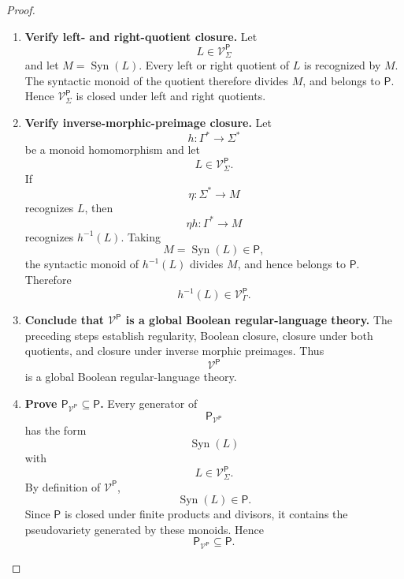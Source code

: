 \begin{proof}
\begin{enumerate}
        \item \textbf{Verify left- and right-quotient closure.}
        Let
        \[
            L\in\mathcal V^{\mathsf P}_\Sigma
        \]
        and let \(M=\operatorname{Syn}(L)\). Every left or right quotient of
        \(L\) is recognized by \(M\). The syntactic monoid of the quotient
        therefore divides \(M\), and belongs to \(\mathsf P\). Hence
        \(\mathcal V^{\mathsf P}_\Sigma\) is closed under left and right
        quotients.

        \item \textbf{Verify inverse-morphic-preimage closure.}
        Let
        \[
            h:\Gamma^*\to\Sigma^*
        \]
        be a monoid homomorphism and let
        \[
            L\in\mathcal V^{\mathsf P}_\Sigma.
        \]
        If
        \[
            \eta:\Sigma^*\to M
        \]
        recognizes \(L\), then
        \[
            \eta h:\Gamma^*\to M
        \]
        recognizes \(h^{-1}(L)\). Taking
        \[
            M=\operatorname{Syn}(L)\in\mathsf P,
        \]
        the syntactic monoid of \(h^{-1}(L)\) divides \(M\), and hence belongs
        to \(\mathsf P\). Therefore
        \[
            h^{-1}(L)
            \in
            \mathcal V^{\mathsf P}_\Gamma.
        \]

        \item \textbf{Conclude that
        \(\mathcal V^{\mathsf P}\) is a global Boolean regular-language
        theory.}
        The preceding steps establish regularity, Boolean closure, closure
        under both quotients, and closure under inverse morphic preimages.
        Thus
        \[
            \mathcal V^{\mathsf P}
        \]
        is a global Boolean regular-language theory.

        \item \textbf{Prove
        \(\mathsf P_{\mathcal V^{\mathsf P}}\subseteq\mathsf P\).}
        Every generator of
        \[
            \mathsf P_{\mathcal V^{\mathsf P}}
        \]
        has the form
        \[
            \operatorname{Syn}(L)
        \]
        with
        \[
            L\in\mathcal V^{\mathsf P}_\Sigma.
        \]
        By definition of \(\mathcal V^{\mathsf P}\),
        \[
            \operatorname{Syn}(L)\in\mathsf P.
        \]
        Since \(\mathsf P\) is closed under finite products and divisors, it
        contains the pseudovariety generated by these monoids. Hence
        \[
            \mathsf P_{\mathcal V^{\mathsf P}}
            \subseteq
            \mathsf P.
        \]


\end{enumerate}
\end{proof}
